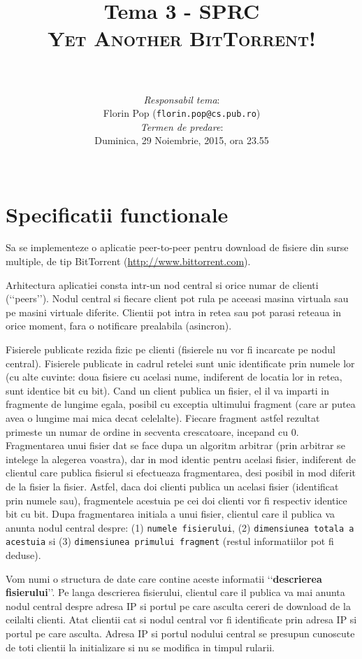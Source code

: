 \documentclass[a4paper]{article}
\author{
\noindent\rule{10cm}{0.4pt}\vspace{0.1in}\\
\textit{Responsabil tema}:\\Florin Pop (\texttt{florin.pop@cs.pub.ro})
\vspace{0.15in}
\\\textit{Termen de predare}:\\Duminica, 29 Noiembrie, 2015, ora 23.55
\vspace{0.15in}\\\noindent\rule{10cm}{0.4pt}
}
\title{Tema 3 - SPRC\\\textsc{Yet Another BitTorrent!}}
\date{}
\begin{document}
\maketitle

\section{Specificatii functionale}
\label{sec1}

\par Sa se implementeze o aplicatie peer-to-peer pentru download de fisiere din surse multiple, de tip BitTorrent (\url{http://www.bittorrent.com}).

\par Arhitectura aplicatiei consta intr-un nod central si orice numar de clienti (\lq\lq{}peers\rq\rq{}). Nodul central si fiecare client pot rula pe aceeasi masina virtuala sau pe masini virtuale diferite. Clientii pot intra in retea sau pot parasi reteaua in orice moment, fara o notificare prealabila (asincron).

\par Fisierele publicate rezida fizic pe clienti (fisierele nu vor fi incarcate pe nodul central). Fisierele publicate in cadrul retelei sunt unic identificate prin numele lor (cu alte cuvinte: doua fisiere cu acelasi nume, indiferent de locatia lor in retea, sunt identice bit cu bit). Cand un client publica un fisier, el il va imparti in fragmente de lungime egala, posibil cu exceptia ultimului fragment (care ar putea avea o lungime mai mica decat celelalte). Fiecare fragment astfel rezultat primeste un numar de ordine in secventa crescatoare, incepand cu 0. Fragmentarea unui fisier dat se face dupa un algoritm arbitrar (prin arbitrar se intelege la alegerea voastra), dar in mod identic pentru acelasi fisier, indiferent de clientul care publica fisierul si efectueaza fragmentarea, desi posibil in mod diferit de la fisier la fisier. Astfel, daca doi clienti publica un acelasi fisier (identificat prin numele sau), fragmentele acestuia pe cei doi clienti vor fi respectiv identice bit cu bit. Dupa fragmentarea initiala a unui fisier, clientul care il publica va anunta nodul central despre: (1) \texttt{numele fisierului}, (2) \texttt{dimensiunea totala a acestuia} si (3) \texttt{dimensiunea primului fragment} (restul informatiilor pot fi deduse).

\par Vom numi o structura de date care contine aceste informatii \lq\lq{}\textbf{descrierea fisierului}\rq\rq{}. Pe langa descrierea fisierului, clientul care il publica va mai anunta nodul central despre adresa IP si portul pe care asculta cereri de download de la ceilalti clienti. Atat clientii cat si nodul central vor fi identificate prin adresa IP si portul pe care asculta. Adresa IP si portul nodului central se presupun cunoscute de toti clientii la initializare si nu se modifica in timpul rularii.
\end{document}
